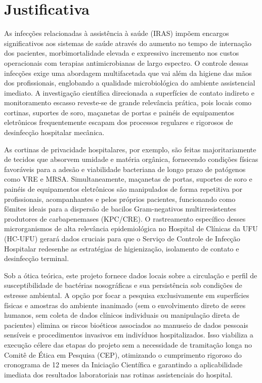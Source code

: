 \documentclass[12pt,a4paper]{article}
\begin{document}
\section{Justificativa}
As infecções relacionadas à assistência à saúde (IRAS) impõem encargos significativos aos sistemas de saúde através do aumento no tempo de internação dos pacientes, morbimortalidade elevada e expressivo incremento nos custos operacionais com terapias antimicrobianas de largo espectro. O controle dessas infecções exige uma abordagem multifacetada que vai além da higiene das mãos dos profissionais, englobando a qualidade microbiológica do ambiente assistencial imediato. A investigação científica direcionada a superfícies de contato indireto e monitoramento escasso reveste-se de grande relevância prática, pois locais como cortinas, suportes de soro, maçanetas de portas e painéis de equipamentos eletrônicos frequentemente escapam dos processos regulares e rigorosos de desinfecção hospitalar mecânica.

As cortinas de privacidade hospitalares, por exemplo, são feitas majoritariamente de tecidos que absorvem umidade e matéria orgânica, fornecendo condições físicas favoráveis para a adesão e viabilidade bacteriana de longo prazo de patógenos como VRE e MRSA. Simultaneamente, maçanetas de portas, suportes de soro e painéis de equipamentos eletrônicos são manipulados de forma repetitiva por profissionais, acompanhantes e pelos próprios pacientes, funcionando como fômites ideais para a dispersão de bacilos Gram-negativos multirresistentes produtores de carbapenemases (KPC/CRE). O rastreamento específico desses microrganismos de alta relevância epidemiológica no Hospital de Clínicas da UFU (HC-UFU) gerará dados cruciais para que o Serviço de Controle de Infecção Hospitalar redesenhe as estratégias de higienização, isolamento de contato e desinfecção terminal.

Sob a ótica teórica, este projeto fornece dados locais sobre a circulação e perfil de susceptibilidade de bactérias nosográficas e sua persistência sob condições de estresse ambiental. A opção por focar a pesquisa exclusivamente em superfícies físicas e amostras do ambiente inanimado (sem o envolvimento direto de seres humanos, sem coleta de dados clínicos individuais ou manipulação direta de pacientes) elimina os riscos bioéticos associados ao manuseio de dados pessoais sensíveis e procedimentos invasivos em indivíduos hospitalizados. Isso viabiliza a execução célere das etapas do projeto sem a necessidade de tramitação longa no Comitê de Ética em Pesquisa (CEP), otimizando o cumprimento rigoroso do cronograma de 12 meses da Iniciação Científica e garantindo a aplicabilidade imediata dos resultados laboratoriais nas rotinas assistenciais do hospital.
\newpage
\end{document}
